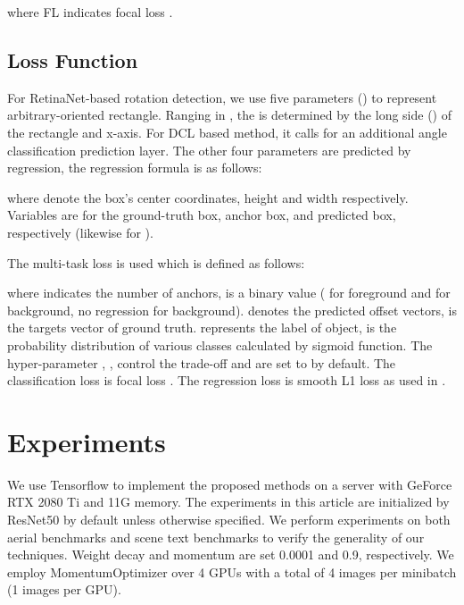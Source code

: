 \documentclass[final]{cvpr}
\begin{document}
where FL indicates focal loss \cite{lin2017focal}.

\subsection{Loss Function}
For RetinaNet-based rotation detection, we use five parameters () to represent arbitrary-oriented rectangle. Ranging in , the  is determined by the long side () of the rectangle and x-axis. For DCL based method, it calls for an additional angle classification prediction layer. The other four parameters are predicted by regression, the regression formula is as follows:

where  denote the box's center coordinates, height and width respectively. Variables  are for the ground-truth box, anchor box, and predicted box, respectively (likewise for ).

The multi-task loss is used which is defined as follows:

where  indicates the number of anchors,  is a binary value ( for foreground and  for background, no regression for background).  denotes the predicted offset vectors,  is the targets vector of ground truth.  represents the label of object,  is the probability distribution of various classes calculated by sigmoid function. The hyper-parameter , ,  control the trade-off and are set to  by default. The classification loss  is focal loss \cite{lin2017focal}. The regression loss  is smooth L1 loss as used in \cite{girshick2015fast}.

\section{Experiments}\label{sec:experiments}
We use Tensorflow \cite{abadi2016tensorflow} to implement the proposed methods on a server with GeForce RTX 2080 Ti and 11G memory. The experiments in this article are initialized by ResNet50 \cite{he2016deep} by default unless otherwise specified. We perform experiments on both aerial benchmarks and scene text benchmarks to verify the generality of our techniques. Weight decay and momentum are set 0.0001 and 0.9, respectively. We employ MomentumOptimizer over 4 GPUs with a total of 4 images per minibatch (1 images per GPU).
\end{document}

